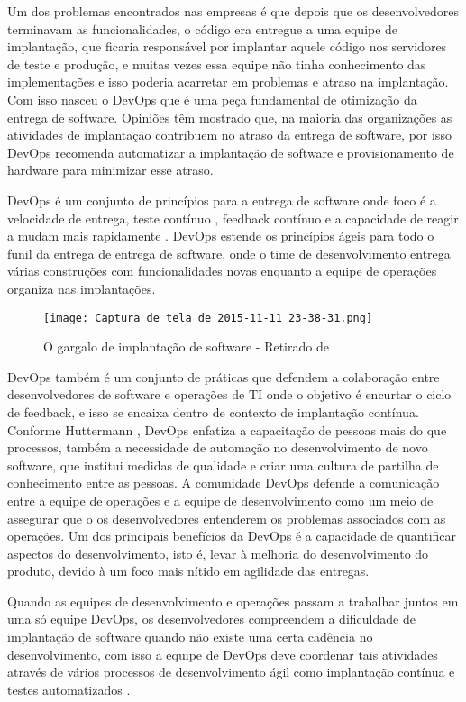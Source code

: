 \documentclass[12pt]{article}
\begin{document}
Um dos problemas encontrados nas empresas é que depois que os desenvolvedores terminavam as funcionalidades, o código era entregue a uma equipe de implantação, que ficaria responsável por implantar aquele código nos servidores de teste e produção, e muitas vezes essa equipe não tinha conhecimento das implementações e isso poderia acarretar em problemas e atraso na implantação. Com isso nasceu o DevOps que é uma peça fundamental de otimização da entrega de software. Opiniões têm mostrado que, na maioria das organizações as atividades de implantação contribuem no atraso da entrega de software, por isso DevOps recomenda automatizar a implantação de software e provisionamento de hardware para minimizar esse atraso. \cite{7173368}

DevOps é um conjunto de princípios para a entrega de software onde foco é a velocidade de entrega, teste contínuo , feedback contínuo e a capacidade de reagir a mudam mais rapidamente \cite{7173368}. DevOps estende os princípios ágeis para todo o funil da entrega de entrega de software, onde o time de desenvolvimento entrega várias construções com funcionalidades novas enquanto a equipe de operações organiza nas implantações.

\begin{figure}[ht]
\centering
\texttt{[image: Captura\_de\_tela\_de\_2015-11-11\_23-38-31.png]}
\caption{O gargalo de implantação de software - Retirado de \cite{7173368}}
\label{fig:exampleFig1}
\end{figure}

DevOps também é um conjunto de práticas que defendem a colaboração entre desenvolvedores de software e operações de TI onde o objetivo é
encurtar o ciclo de feedback, e isso se encaixa dentro de contexto de implantação contínua. Conforme Huttermann \cite{httermann2012devops}, DevOps enfatiza a capacitação de pessoas mais do que processos, também a necessidade de automação no desenvolvimento de novo software, que institui medidas de qualidade e criar uma cultura de partilha de conhecimento entre as pessoas. A comunidade DevOps defende a comunicação entre a equipe de operações e a equipe de desenvolvimento como um meio de assegurar que o os desenvolvedores entenderem os problemas associados com as operações. Um dos principais benefícios da DevOps é a capacidade de quantificar aspectos do desenvolvimento, isto é, levar à melhoria do desenvolvimento do produto, devido à um foco mais nítido em agilidade das entregas.

Quando as equipes de desenvolvimento e operações passam a trabalhar juntos em uma só equipe DevOps, os desenvolvedores compreendem a dificuldade de implantação de software quando não existe uma certa cadência no desenvolvimento, com isso a equipe de DevOps deve coordenar tais atividades através de vários processos de desenvolvimento ágil como implantação contínua e testes automatizados \cite{6265084}. 
\end{document}
